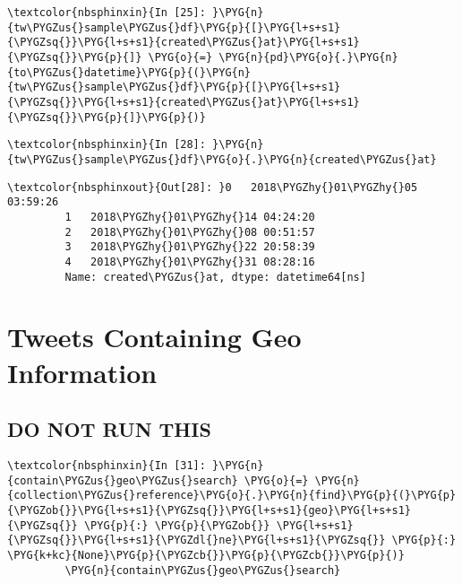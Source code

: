 \documentclass[letterpaper,10pt,english]{sphinxmanual}
\begin{document}
%
\begin{Verbatim}[commandchars=\\\{\}]
\textcolor{nbsphinxin}{In [25]: }\PYG{n}{tw\PYGZus{}sample\PYGZus{}df}\PYG{p}{[}\PYG{l+s+s1}{\PYGZsq{}}\PYG{l+s+s1}{created\PYGZus{}at}\PYG{l+s+s1}{\PYGZsq{}}\PYG{p}{]} \PYG{o}{=} \PYG{n}{pd}\PYG{o}{.}\PYG{n}{to\PYGZus{}datetime}\PYG{p}{(}\PYG{n}{tw\PYGZus{}sample\PYGZus{}df}\PYG{p}{[}\PYG{l+s+s1}{\PYGZsq{}}\PYG{l+s+s1}{created\PYGZus{}at}\PYG{l+s+s1}{\PYGZsq{}}\PYG{p}{]}\PYG{p}{)}
\end{Verbatim}

%
\begin{Verbatim}[commandchars=\\\{\}]
\textcolor{nbsphinxin}{In [28]: }\PYG{n}{tw\PYGZus{}sample\PYGZus{}df}\PYG{o}{.}\PYG{n}{created\PYGZus{}at}
\end{Verbatim}

%
\begin{Verbatim}[commandchars=\\\{\}]
\textcolor{nbsphinxout}{Out[28]: }0   2018\PYGZhy{}01\PYGZhy{}05 03:59:26
         1   2018\PYGZhy{}01\PYGZhy{}14 04:24:20
         2   2018\PYGZhy{}01\PYGZhy{}08 00:51:57
         3   2018\PYGZhy{}01\PYGZhy{}22 20:58:39
         4   2018\PYGZhy{}01\PYGZhy{}31 08:28:16
         Name: created\PYGZus{}at, dtype: datetime64[ns]
\end{Verbatim}


\section{Tweets Containing Geo Information}
\label{\detokenize{04-mongo/04-01-poking-around:Tweets-Containing-Geo-Information}}\label{\detokenize{04-mongo/04-01-poking-around::doc}}

\subsection{DO NOT RUN THIS}
\label{\detokenize{04-mongo/04-01-poking-around:DO-NOT-RUN-THIS}}
%
\begin{Verbatim}[commandchars=\\\{\}]
\textcolor{nbsphinxin}{In [31]: }\PYG{n}{contain\PYGZus{}geo\PYGZus{}search} \PYG{o}{=} \PYG{n}{collection\PYGZus{}reference}\PYG{o}{.}\PYG{n}{find}\PYG{p}{(}\PYG{p}{\PYGZob{}}\PYG{l+s+s1}{\PYGZsq{}}\PYG{l+s+s1}{geo}\PYG{l+s+s1}{\PYGZsq{}} \PYG{p}{:} \PYG{p}{\PYGZob{}} \PYG{l+s+s1}{\PYGZsq{}}\PYG{l+s+s1}{\PYGZdl{}ne}\PYG{l+s+s1}{\PYGZsq{}} \PYG{p}{:} \PYG{k+kc}{None}\PYG{p}{\PYGZcb{}}\PYG{p}{\PYGZcb{}}\PYG{p}{)}
         \PYG{n}{contain\PYGZus{}geo\PYGZus{}search}
\end{Verbatim}
\end{document}
